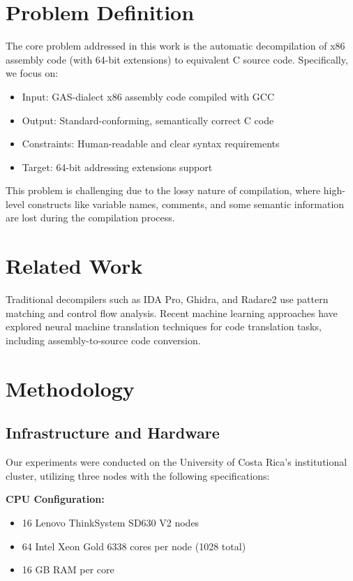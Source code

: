 \documentclass[conference]{IEEEtran}
\begin{document}
\section{Problem Definition}

The core problem addressed in this work is the automatic decompilation of x86 assembly code (with 64-bit extensions) to equivalent C source code. Specifically, we focus on:

\begin{itemize}
\item Input: GAS-dialect x86 assembly code compiled with GCC
\item Output: Standard-conforming, semantically correct C code
\item Constraints: Human-readable and clear syntax requirements
\item Target: 64-bit addressing extensions support
\end{itemize}

This problem is challenging due to the lossy nature of compilation, where high-level constructs like variable names, comments, and some semantic information are lost during the compilation process.

\section{Related Work}

Traditional decompilers such as IDA Pro, Ghidra, and Radare2 use pattern matching and control flow analysis. Recent machine learning approaches have explored neural machine translation techniques for code translation tasks, including assembly-to-source code conversion.

\section{Methodology}

\subsection{Infrastructure and Hardware}

Our experiments were conducted on the University of Costa Rica's institutional cluster, utilizing three nodes with the following specifications:

\textbf{CPU Configuration:}
\begin{itemize}
\item 16 Lenovo ThinkSystem SD630 V2 nodes
\item 64 Intel Xeon Gold 6338 cores per node (1028 total)
\item 16 GB RAM per core
\end{itemize}
\end{document}
